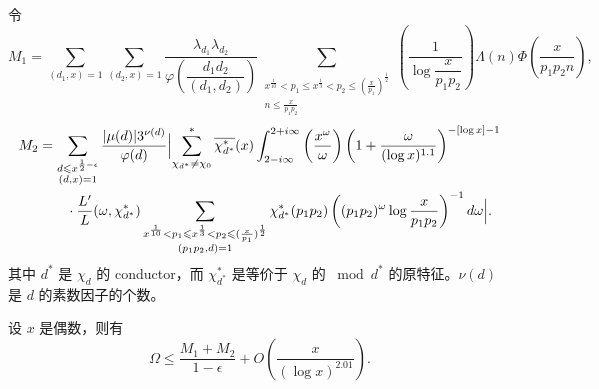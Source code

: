 令
\[
M_1=\sum_{(d_1,x)=1}\sum_{(d_2,x)=1}\frac{\lambda_{d_1}\lambda_{d_2}}{\varphi\left(\dfrac{d_1d_2}{(d_1,d_2)}\right)}
\sum_{\substack{x^{\frac1{10}}<p_1\leqslant x^{\frac13}<p_2\leqslant(\frac{x}{p_1})^{\frac12}\\n\leqslant\frac{x}{p_1p_2}}}
\left(\frac{1}{\log\dfrac{x}{p_1p_2}}\right)\Lambda(n)\Phi\left(\frac{x}{p_1p_2n}\right),
\]
\begin{align*}
M_2&=\sum_{\substack{d\leqslant x^{\frac12-\epsilon}\\(d,x)=1}}\frac{|\mu(d)|3^{\nu(d)}}{\varphi(d)}
\Bigl|\sum_{\chi_{d^*}\neq\chi_0}^{*}\overline{\chi_{d^*}^*}(x)
\int_{2-i\infty}^{2+i\infty}\left(\frac{x^\omega}{\omega}\right)\left(1+\frac{\omega}{(\log x)^{1.1}}\right)^{-[\log x]-1}\\
&\qquad\cdot\frac{L'}{L}(\omega,\chi_{d^*}^*)
\sum_{\substack{x^{\frac1{10}}<p_1\leqslant x^{\frac13}<p_2\leqslant(\frac{x}{p_1})^{\frac12}\\(p_1p_2,d)=1}}
\chi_{d^*}^*(p_1p_2)\left((p_1p_2)^\omega\log\frac{x}{p_1p_2}\right)^{-1}d\omega\Bigr|.
\end{align*}
其中 $d^*$ 是 $\chi_d$ 的 conductor，而 $\chi_{d^*}^*$ 是等价于 $\chi_d$ 的 $\bmod d^*$ 的原特征。$\nu(d)$ 是 $d$ 的素数因子的个数。

\begin{lemma}
设 $x$ 是偶数，则有
\[
\Omega\leqslant\frac{M_1+M_2}{1-\epsilon}+O\left(\frac{x}{(\log x)^{2.01}}\right).
\]
\end{lemma}

